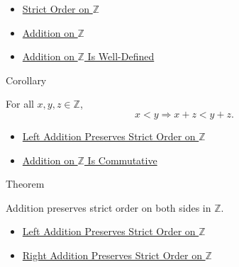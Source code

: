 \begin{dependencies}
\begin{itemize}
  \item \hyperref[def:strict-order-on-z]{Strict Order on $\mathbb{Z}$}
  \item \hyperref[def:addition-on-z-classes]{Addition on $\mathbb{Z}$}
  \item \hyperref[thm:addition-on-z-well-defined]{Addition on $\mathbb{Z}$ Is Well-Defined}
\end{itemize}
\end{dependencies}

\begin{corollarybox}{Corollary}
\begin{corollary}
\label{cor:right-addition-preserves-strict-order-on-z}
For all $x,y,z\in\mathbb{Z}$,
\[
x<y \Longrightarrow x+z<y+z.
\]
\end{corollary}
\end{corollarybox}

\begin{dependencies}
\begin{itemize}
  \item \hyperref[thm:left-addition-preserves-strict-order-on-z]{Left Addition Preserves Strict Order on $\mathbb{Z}$}
  \item \hyperref[thm:addition-on-z-commutative]{Addition on $\mathbb{Z}$ Is Commutative}
\end{itemize}
\end{dependencies}

\begin{theorembox}{Theorem}
\begin{theorem}
\label{thm:addition-preserves-strict-order-on-z}
Addition preserves strict order on both sides in $\mathbb{Z}$.
\end{theorem}
\end{theorembox}

\begin{dependencies}
\begin{itemize}
  \item \hyperref[thm:left-addition-preserves-strict-order-on-z]{Left Addition Preserves Strict Order on $\mathbb{Z}$}
  \item \hyperref[cor:right-addition-preserves-strict-order-on-z]{Right Addition Preserves Strict Order on $\mathbb{Z}$}
\end{itemize}
\end{dependencies}

